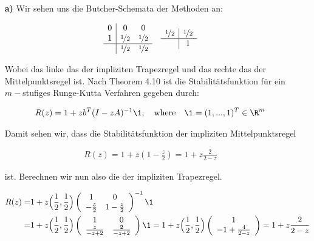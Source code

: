 \begin{solution}
 \begin{itemize}
   \item[\textbf{a)}]Wir sehen uns die Butcher-Schemata der Methoden an:

    \begin{align*}
      \begin{array}{c|cc}
        0 & 0 & 0 \\
        1 & \nicefrac{1}{2} & \nicefrac{1}{2} \\
        \hline
        & \nicefrac{1}{2} & \nicefrac{1}{2}
      \end{array}
      \quad
      \begin{array}{c|c}
        \nicefrac{1}{2} & \nicefrac{1}{2} \\
        \hline
        & 1
      \end{array}
    \end{align*}

    Wobei das linke das der impliziten Trapezregel und das rechte das der Mittelpunktsregel ist.
    Nach Theorem 4.10 ist die Stabilitätsfunktion für ein $m-$stufiges Runge-Kutta
    Verfahren gegeben durch:

    \begin{align*}
      R(z) = 1 +zb^T (I- zA)^{-1} \1, \quad \text{where} \quad \1 =(1,...,1)^T
      \in \R^m
    \end{align*}

    Damit sehen wir, dass die Stabilitätsfunktion der impliziten Mittelpunktsregel

    \begin{align*}
        R(z) = 1 + z\left(1- \frac{z}{2}\right) = 1+z \frac{2}{2-z}
    \end{align*}

    ist. Berechnen wir nun also die der impliziten Trapezregel.

    \begin{align*}
      R(z) =& 1 +z\Big(\frac{1}{2}, \frac{1}{2}\Big) \left(
      \begin{array}{cc}
        1 & 0 \\
        -\frac{z}{2} & 1- \frac{z}{2}
      \end{array}
      \right)^{-1}
      \1 \\
      =& 1 +z \Big(\frac{1}{2}, \frac{1}{2}\Big) \left(
      \begin{array}{cc}
        1 & 0 \\
        \frac{z}{-z+2} & \frac{2}{-z+2}
      \end{array}
      \right)
      \1 = 1+z\Big(\frac{1}{2},\frac{1}{2}\Big) \left(
      \begin{array}{c}
        1 \\
        -1+\frac{4}{2-z}
      \end{array}
      \right) = 1+z\frac{2}{2-z}
    \end{align*}


\end{itemize}
\end{solution}
